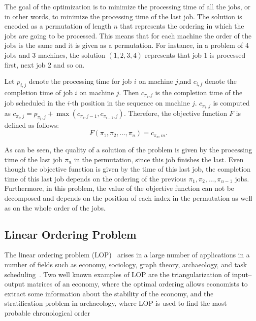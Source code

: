 The goal of the optimization is to minimize the processing time of all the jobs, or in other words, to minimize the processing time of the last job. The solution is encoded as a permutation of length $n$ that represents the ordering in which the jobs are going to be processed. This means that for each machine the order of the jobs is the same and it is given as a permutation. For instance, in a problem of 4 jobs and 3 machines, the solution $(1,2,3,4)$ represents that job 1 is processed first, next job 2 and so on.

Let $p_{i,j}$ denote the processing time for job $i$ on machine $j$,and $c_{i,j}$ denote the
completion time of job $i$ on machine $j$. Then $c_{\pi_{i},j}$ is the completion time of the job scheduled in the $i$-th position in the sequence on machine $j$. $c_{\pi_{i},j}$ is computed as $c_{\pi_{i},j} = p_{\pi_i,j} + \max{ (c_{\pi_{i},j-1},c_{\pi_{i-1},j}) }$. Therefore, the objective function $F$ is defined as follows:
\begin{equation*}
	F(\pi_1, \pi_2, ... , \pi_n) = c_{\pi_n,m} \text{.}
\end{equation*}

As can be seen, the quality of a solution of the problem is given by the processing time of the last job $\pi_n$ in the permutation, since this job finishes the last. Even though the objective function is given by the time of this last job, the completion time of this last job depends on the ordering of the previous $\pi_1, \pi_2, ... , \pi_{n-1}$ jobs. Furthermore, in this problem, the value of the objective function can not be decomposed and depends on the position of each index in the permutation as well as on the whole order of the jobs.


\subsection{Linear Ordering Problem}
The linear ordering problem (LOP)~\citep{marti2011linear} arises in a large number of applications in a number of fields such as economy, sociology, graph theory, archaeology, and task scheduling~\citep{schiavinotto2004linear}. Two well known examples of LOP are the triangularization of input–output matrices of an economy, where the optimal ordering allows economists to extract some information about the stability of the economy, and the stratification problem in archaeology, where LOP is used to find the most probable chronological order

